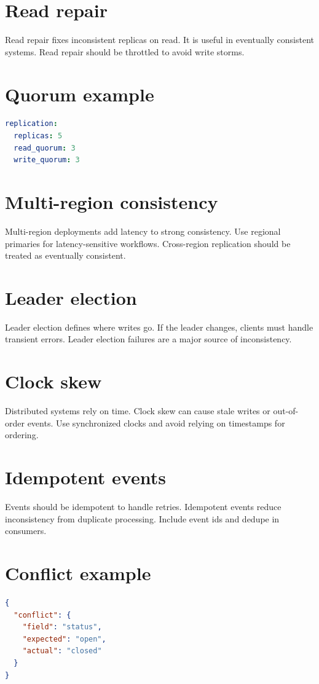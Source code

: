\section{Read repair}
Read repair fixes inconsistent replicas on read.
It is useful in eventually consistent systems.
Read repair should be throttled to avoid write storms.

\section{Quorum example}
\begin{lstlisting}[language=YAML]
replication:
  replicas: 5
  read_quorum: 3
  write_quorum: 3
\end{lstlisting}

\section{Multi-region consistency}
Multi-region deployments add latency to strong consistency.
Use regional primaries for latency-sensitive workflows.
Cross-region replication should be treated as eventually consistent.

\section{Leader election}
Leader election defines where writes go.
If the leader changes, clients must handle transient errors.
Leader election failures are a major source of inconsistency.

\section{Clock skew}
Distributed systems rely on time.
Clock skew can cause stale writes or out-of-order events.
Use synchronized clocks and avoid relying on timestamps for ordering.

\section{Idempotent events}
Events should be idempotent to handle retries.
Idempotent events reduce inconsistency from duplicate processing.
Include event ids and dedupe in consumers.

\section{Conflict example}
\begin{lstlisting}[language=JSON]
{
  "conflict": {
    "field": "status",
    "expected": "open",
    "actual": "closed"
  }
}
\end{lstlisting}

